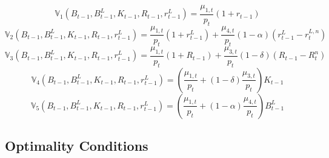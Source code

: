 \documentclass[11pt,a4paper,margin=1.5in]{article}
\begin{document}
\begin{equation}
	\mathbb{V}\!_1\left(B_{t-1}, B^L_{t-1}, K_{t-1}, R_{t-1}, r^L_{t-1}\right) = \frac{\mu_{1,t}}{p_t}(1+r_{t-1})
	\label{eq:HH_BS_B}
\end{equation}
%
\begin{equation}
	\mathbb{V}\!_2\left(B_{t-1}, B^L_{t-1}, K_{t-1}, R_{t-1}, r^L_{t-1}\right) = \frac{\mu_{1,t}}{p_t}(1+r^L_{t-1}) + \frac{\mu_{4,t}}{p_t}(1-\alpha)\left(r^L_{t-1} - r^{L,n}_t\right)
	\label{eq:HH_BS_BL}
\end{equation}
%
\begin{equation}
	\mathbb{V}\!_3\left(B_{t-1}, B^L_{t-1}, K_{t-1}, R_{t-1}, r^L_{t-1}\right) = \frac{\mu_{1,t}}{p_t}(1 + R_{t-1}) + \frac{\mu_{3,t}}{p_t}(1-\delta)\left(R_{t-1} - R^{n}_t\right)
	\label{eq:HH_BS_K}
\end{equation}
%
\begin{equation}
	\mathbb{V}\!_4\left(B_{t-1}, B^L_{t-1}, K_{t-1}, R_{t-1}, r^L_{t-1}\right) = \left(\frac{\mu_{1,t}}{p_t} + (1-\delta)\frac{\mu_{3,t}}{p_t}\right)K_{t-1}
	\label{eq:HH_BS_R}
\end{equation}
%
\begin{equation}
	\mathbb{V}\!_5\left(B_{t-1}, B^L_{t-1}, K_{t-1}, R_{t-1}, r^L_{t-1}\right) = \left(\frac{\mu_{1,t}}{p_t} + (1-\alpha)\frac{\mu_{4,t}}{p_t}\right)B^L_{t-1}
	\label{eq:HH_BS_rL}
\end{equation}

\subsection{Optimality Conditions}
\end{document}
